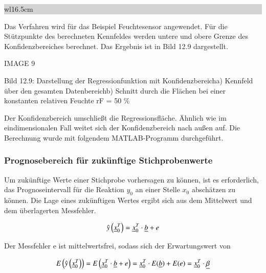 \noindent
\colorbox{lightgray}{%
%
\renewcommand\arraystretch{0.6}%
\begin{tabular}{ wl{16.5cm} }
{\selectfont
{}}
\end{tabular}%
}\medskip

\noindent Das Verfahren wird f\"{u}r das Beispiel Feuchtesensor angewendet. F\"{u}r die St\"{u}tzpunkte des berechneten Kennfeldes werden untere und obere Grenze des Konfidenzbereiches berechnet. Das Ergebnis ist in Bild 12.9 dargestellt.

IMAGE 9

\noindent Bild 12.9: Darstellung der Regressionfunktion mit Konfidenzbereicha) Kennfeld \"{u}ber den gesamten Datenbereichb) Schnitt durch die Fl\"{a}chen bei einer konstanten relativen Feuchte rF = 50 \%\newline

\noindent Der Konfidenzbereich umschlie{\ss}t die Regressionsfl\"{a}che. \"{A}hnlich wie im eindimensionalen Fall weitet sich der Konfidenzbereich nach au{\ss}en auf. Die Berechnung wurde mit folgendem MATLAB-Programm durchgef\"{u}hrt.



\subsubsection{Prognosebereich f\"{u}r zuk\"{u}nftige Stichprobenwerte}

\noindent Um zuk\"{u}nftige Werte einer Stichprobe vorhersagen zu k\"{o}nnen, ist es erforderlich, das Prognoseintervall f\"{u}r die Reaktion $y_{0}$ an einer Stelle $x_{0}$ absch\"{a}tzen zu k\"{o}nnen. Die Lage eines zuk\"{u}nftigen Wertes ergibt sich aus dem Mittelwert und dem \"{u}berlagerten Messfehler. 

\begin{equation}\label{eq:thirteenseventy}
\hat{y}\left(\underline{x}_{0}^{T} \right)=\underline{x}_{0}^{T} \cdot \underline{b}+e
\end{equation}

\noindent Der Messfehler e ist mittelwertsfrei, sodass sich der Erwartungswert von 

\begin{equation}\label{eq:thirteenseventyone}
E\left(\hat{y}\left(\underline{x}_{0}^{T} \right)\right)=E\left(\underline{x}_{0}^{T} \cdot \underline{b}+e\right)=\underline{x}_{0}^{T} \cdot E(\underline{b})+E(e)=\underline{x}_{0}^{T} \cdot \underline{\beta }
\end{equation}

